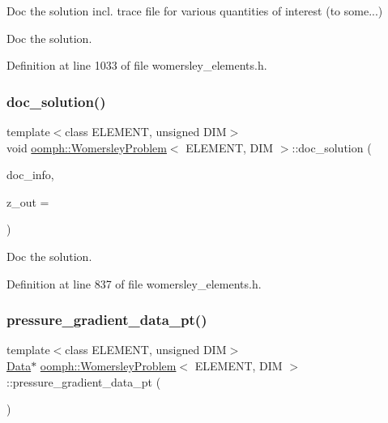 Doc the solution incl. trace file for various quantities of interest (to some...) 

Doc the solution. 

Definition at line 1033 of file womersley\+\_\+elements.\+h.

\mbox{\label{classoomph_1_1WomersleyProblem_a367c83d9a996c426cb65a7baa86af81b}} 
\subsubsection{\texorpdfstring{doc\+\_\+solution()}{doc\_solution()}\hspace{0.1cm}{\footnotesize\ttfamily [2/2]}}
{\footnotesize\ttfamily template$<$class E\+L\+E\+M\+E\+NT, unsigned D\+IM$>$ \\
void \hyperlink{classoomph_1_1WomersleyProblem}{oomph\+::\+Womersley\+Problem}$<$ E\+L\+E\+M\+E\+NT, D\+IM $>$\+::doc\+\_\+solution (\begin{DoxyParamCaption}\item[{\hyperlink{classoomph_1_1DocInfo}{Doc\+Info} \&}]{doc\+\_\+info,  }\item[{const double \&}]{z\+\_\+out = {} }\end{DoxyParamCaption})\hspace{0.3cm}{\ttfamily [inline]}}



Doc the solution. 



Definition at line 837 of file womersley\+\_\+elements.\+h.

\mbox{\label{classoomph_1_1WomersleyProblem_a648496a026e53b453e16c161f9f44434}} 
\subsubsection{\texorpdfstring{pressure\+\_\+gradient\+\_\+data\+\_\+pt()}{pressure\_gradient\_data\_pt()}}
{\footnotesize\ttfamily template$<$class E\+L\+E\+M\+E\+NT, unsigned D\+IM$>$ \\
\hyperlink{classoomph_1_1Data}{Data}$\ast$ \hyperlink{classoomph_1_1WomersleyProblem}{oomph\+::\+Womersley\+Problem}$<$ E\+L\+E\+M\+E\+NT, D\+IM $>$\+::pressure\+\_\+gradient\+\_\+data\+\_\+pt (\begin{DoxyParamCaption}{ }\end{DoxyParamCaption})\hspace{0.3cm}{\ttfamily [inline]}}



